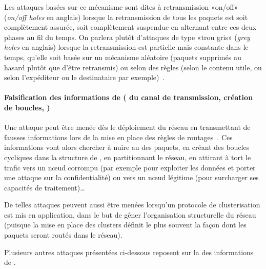Les attaques basées sur ce mécanisme sont dites à retransmission «on/off» (\textit{on/off holes} en anglais) lorsque la retransmission de tous les paquets est soit complètement assurée, soit complètement suspendue en alternant entre ces deux phases au fil du temps.
On parlera plutôt d'attaques de type «trou gris» (\textit{grey holes} en anglais) lorsque la retransmission est partielle mais constante dans le temps, qu'elle soit basée sur un mécanisme aléatoire (paquets supprimés au hasard plutôt que d'être retransmis) ou selon des règles (selon le contenu utile, ou selon l'expéditeur ou le destinataire par exemple)~\cite{ZTLMK13}.

        \paragraph{Falsification des informations de  ( du canal de transmission, création de boucles, \etc)}
Une attaque peut être menée dès le déploiement du réseau en transmettant de fausses informations lors de la mise en place des règles de routages~\cite{AD14}.
Ces informations vont alors chercher à nuire au  des paquets, en créant des boucles cycliques dans la structure de , en partitionnant le réseau, en attirant à tort le trafic vers un nœud corrompu (par exemple pour exploiter les données et porter une attaque sur la confidentialité) ou vers un nœud légitime (pour surcharger ses capacités de traitement)\dots

De telles attaques peuvent aussi être menées lorsqu'un protocole de clusterisation est mis en application, dans le but de gêner l'organisation structurelle du réseau (puisque la mise en place des clusters définit le plus souvent la façon dont les paquets seront routés dans le réseau).

Plusieurs autres attaques présentées ci-dessous reposent sur la  des informations de .

